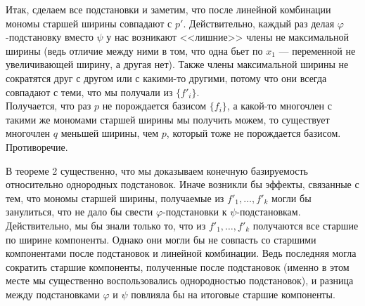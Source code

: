 Итак, сделаем все подстановки и заметим, что после линейной комбинации мономы старшей ширины совпадают с $p'$.
Действительно, каждый раз делая  $\varphi$-подстановку вместо $\psi$ у нас возникают <<лишние>> члены не максимальной ширины (ведь отличие между ними в том, что одна бьет по $x_1$ --- переменной не увеличивающей ширину, а другая нет).
Также члены максимальной ширины не сократятся друг с другом или с какими-то другими, потому что они всегда совпадают с теми, что мы получали из $\{f'_i\}$.\\
Получается, что раз $p$ не порождается базисом $\{f_i\}$, а какой-то многочлен с такими же мономами старшей ширины мы получить можем, то существует многочлен $q$ меньшей ширины, чем $p$, который тоже не порождается базисом.
Противоречие.
\vskip 0.1in\noindent
\begin{remark}
    В теореме 2 существенно, что мы доказываем конечную базируемость относительно однородных подстановок.
    Иначе возникли бы эффекты, связанные с тем, что мономы старшей ширины, получаемые из $f'_1,\ldots,f'_k$ могли бы занулиться, что не дало бы свести $\varphi$-подстановки к $\psi$-подстановкам. \\Действительно, мы бы знали только то, что из $f'_1,\ldots,f'_k$ получаются все старшие по ширине компоненты.
    Однако они могли бы не совпасть со старшими компонентами после подстановок и линейной комбинации.
    Ведь последняя могла сократить старшие компоненты, полученные после подстановок (именно в этом месте мы существенно воспользовались однородностью подстановок), и разница между подстановками $\varphi$ и $\psi$ повлияла бы на итоговые старшие компоненты.
\end{remark}